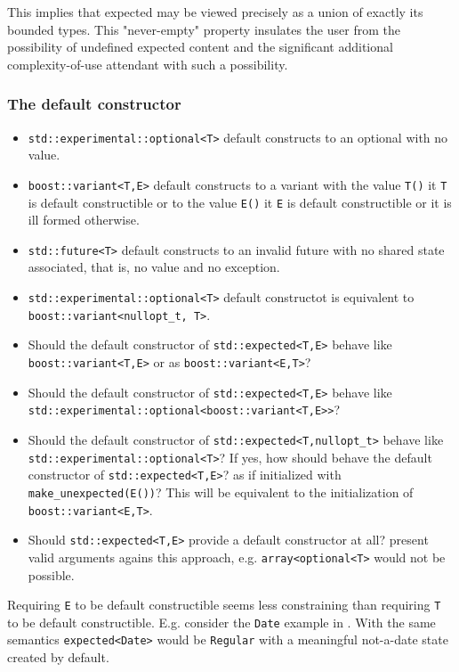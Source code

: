 \documentclass[a4paper,10pt]{article}
\newcommand{\cpp}[1]{\lstinline{#1}}
\begin{document}
This implies that expected may be viewed precisely as a union of exactly its bounded types. This "never-empty" property insulates the user from the possibility of undefined expected content and the significant additional complexity-of-use attendant with such a possibility.

\subsubsection{The default constructor}

\begin{itemize}
\item \cpp{std::experimental::optional<T>} default constructs to an optional with no value. 
\item \cpp{boost::variant<T,E>} default constructs to a variant with the value \cpp{T()} it \cpp{T} is default constructible or to the value \cpp{E()} it \cpp{E} is default constructible or it is ill formed otherwise. 
\item \cpp{std::future<T>} default constructs to an invalid future with no shared state associated, that is, no value and no exception.
\item \cpp{std::experimental::optional<T>} default constructot is equivalent to \cpp{boost::variant<nullopt_t, T>}.
\end{itemize}

\begin{itemize}
\item Should the default constructor of \cpp{std::expected<T,E>} behave like \cpp{boost::variant<T,E>} or as \cpp{boost::variant<E,T>}?
\item Should the default constructor of \cpp{std::expected<T,E>} behave like \cpp{std::experimental::optional<boost::variant<T,E>>}?
\item Should the default constructor of \cpp{std::expected<T,nullopt_t>} behave like \cpp{std::experimental::optional<T>}? If yes, how should behave the default constructor of \cpp{std::expected<T,E>}? as if initialized with \cpp{make_unexpected(E())}? This will be equivalent to the initialization of \cpp{boost::variant<E,T>}.
\item Should \cpp{std::expected<T,E>} provide a default constructor at all? \cite{OptionalRev3} present valid arguments agains this approach, e.g. \cpp{array<optional<T>} would not be possible. 
\end{itemize}

Requiring \cpp{E} to be default constructible seems less constraining than requiring \cpp{T} to be default constructible. E.g. consider the \cpp{Date} example in \cite{OptionalRev3}. With the same semantics \cpp{expected<Date>} would be \cpp{Regular} with a meaningful not-a-date state created by default.
\end{document}
